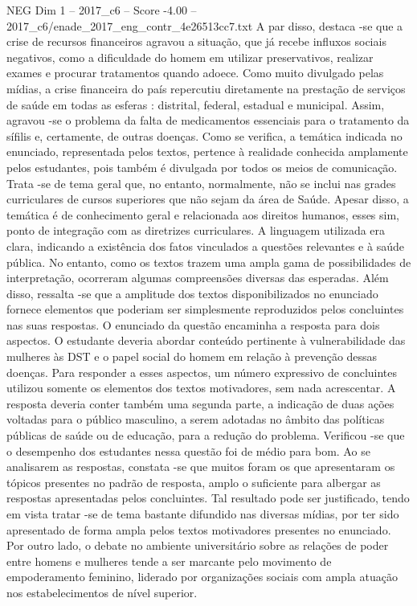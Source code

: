\begin{textsample}{NEG Dim 1 – 2017\_c6 – Score -4.00 – 2017\_c6/enade\_2017\_eng\_contr\_4e26513cc7.txt}
A par disso, destaca -se que a crise de recursos financeiros agravou a situação, que já recebe influxos sociais negativos, como a dificuldade do homem em utilizar preservativos, realizar exames e procurar tratamentos quando adoece.
Como muito divulgado pelas mídias, a crise financeira do país repercutiu diretamente na prestação de serviços de saúde em todas as esferas : distrital, federal, estadual e municipal.
Assim, agravou -se o problema da falta de medicamentos essenciais para o tratamento da sífilis e, certamente, de outras doenças.
Como se verifica, a temática indicada no enunciado, representada pelos textos, pertence à realidade conhecida amplamente pelos estudantes, pois também é divulgada por todos os meios de comunicação.
Trata -se de tema geral que, no entanto, normalmente, não se inclui nas grades curriculares de cursos superiores que não sejam da área de Saúde.
Apesar disso, a temática é de conhecimento geral e relacionada aos direitos humanos, esses sim, ponto de integração com as diretrizes curriculares.
A linguagem utilizada era clara, indicando a existência dos fatos vinculados a questões relevantes e à saúde pública.
No entanto, como os textos trazem uma ampla gama de possibilidades de interpretação, ocorreram algumas compreensões diversas das esperadas.
Além disso, ressalta -se que a amplitude dos textos disponibilizados no enunciado fornece elementos que poderiam ser simplesmente reproduzidos pelos concluintes nas suas respostas.
O enunciado da questão encaminha a resposta para dois aspectos.
O estudante deveria abordar conteúdo pertinente à vulnerabilidade das mulheres às DST e o papel social do homem em relação à prevenção dessas doenças.
Para responder a esses aspectos, um número expressivo de concluintes utilizou somente os elementos dos textos motivadores, sem nada acrescentar.
A resposta deveria conter também uma segunda parte, a indicação de duas ações voltadas para o público masculino, a serem adotadas no âmbito das políticas públicas de saúde ou de educação, para a redução do problema.
Verificou -se que o desempenho dos estudantes nessa questão foi de médio para bom.
Ao se analisarem as respostas, constata -se que muitos foram os que apresentaram os tópicos presentes no padrão de resposta, amplo o suficiente para albergar as respostas apresentadas pelos concluintes.
Tal resultado pode ser justificado, tendo em vista tratar -se de tema bastante difundido nas diversas mídias, por ter sido apresentado de forma ampla pelos textos motivadores presentes no enunciado.
Por outro lado, o debate no ambiente universitário sobre as relações de poder entre homens e mulheres tende a ser marcante pelo movimento de empoderamento feminino, liderado por organizações sociais com ampla atuação nos estabelecimentos de nível superior.

\end{textsample}
